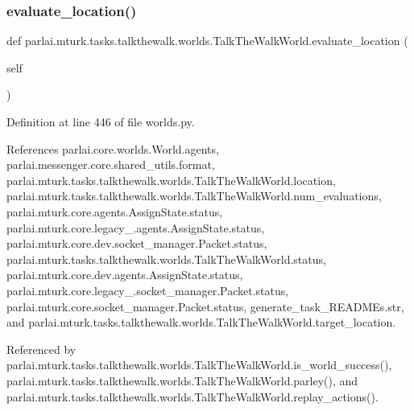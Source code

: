 \mbox{\label{classparlai_1_1mturk_1_1tasks_1_1talkthewalk_1_1worlds_1_1TalkTheWalkWorld_a02bbcb1c7fb2301308620a9844427112}} 
\subsubsection{\texorpdfstring{evaluate\+\_\+location()}{evaluate\_location()}}
{\footnotesize\ttfamily def parlai.\+mturk.\+tasks.\+talkthewalk.\+worlds.\+Talk\+The\+Walk\+World.\+evaluate\+\_\+location (\begin{DoxyParamCaption}\item[{}]{self }\end{DoxyParamCaption})}



Definition at line 446 of file worlds.\+py.



References parlai.\+core.\+worlds.\+World.\+agents, parlai.\+messenger.\+core.\+shared\+\_\+utils.\+format, parlai.\+mturk.\+tasks.\+talkthewalk.\+worlds.\+Talk\+The\+Walk\+World.\+location, parlai.\+mturk.\+tasks.\+talkthewalk.\+worlds.\+Talk\+The\+Walk\+World.\+num\+\_\+evaluations, parlai.\+mturk.\+core.\+agents.\+Assign\+State.\+status, parlai.\+mturk.\+core.\+legacy\+\_.\+agents.\+Assign\+State.\+status, parlai.\+mturk.\+core.\+dev.\+socket\+\_\+manager.\+Packet.\+status, parlai.\+mturk.\+tasks.\+talkthewalk.\+worlds.\+Talk\+The\+Walk\+World.\+status, parlai.\+mturk.\+core.\+dev.\+agents.\+Assign\+State.\+status, parlai.\+mturk.\+core.\+legacy\+\_.\+socket\+\_\+manager.\+Packet.\+status, parlai.\+mturk.\+core.\+socket\+\_\+manager.\+Packet.\+status, generate\+\_\+task\+\_\+\+R\+E\+A\+D\+M\+Es.\+str, and parlai.\+mturk.\+tasks.\+talkthewalk.\+worlds.\+Talk\+The\+Walk\+World.\+target\+\_\+location.



Referenced by parlai.\+mturk.\+tasks.\+talkthewalk.\+worlds.\+Talk\+The\+Walk\+World.\+is\+\_\+world\+\_\+success(), parlai.\+mturk.\+tasks.\+talkthewalk.\+worlds.\+Talk\+The\+Walk\+World.\+parley(), and parlai.\+mturk.\+tasks.\+talkthewalk.\+worlds.\+Talk\+The\+Walk\+World.\+replay\+\_\+actions().

